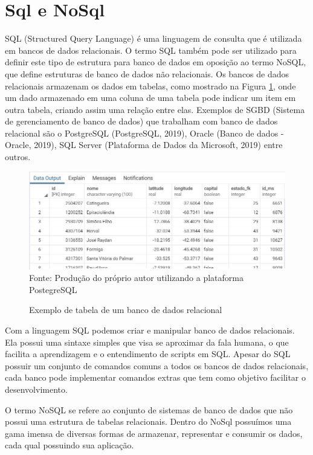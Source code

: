 \documentclass[
	12pt,				%
	openright,			%
	oneside,			%
	a4paper,			%
	chapter=TITLE,		%
	section=TITLE,		%
	subsection=TITLE,	%
	subsubsection=TITLE,%
	english,			%
	brazil				%
	]{abntex2}
\theoremstyle{definition}
\begin{document}
\section{Sql e NoSql}

    SQL (Structured Query Language) é uma linguagem de consulta que é utilizada em bancos de dados relacionais. O termo SQL também pode ser utilizado para definir este tipo de estrutura para banco de dados em oposição ao termo NoSQL, que define estruturas de banco de
    dados não relacionais. Os bancos de dados relacionais armazenam os dados em tabelas, como mostrado na Figura \ref{exemplo tabela}, onde um dado armazenado em uma coluna de uma tabela pode indicar um item em outra tabela, criando assim uma relação entre elas. Exemplos de SGBD (Sistema de gerenciamento de banco de dados) que trabalham com banco de dados relacional são o PostgreSQL (PostgreSQL, 2019), Oracle (Banco de dados - Oracle, 2019), SQL Server (Plataforma de Dados da Microsoft, 2019) entre outros. 
    
    \begin{figure}[!h]
         \centering
         \caption{Exemplo de tabela de um banco de dados relacional}
         \includegraphics[scale=0.8]{imagens/exemplo-tabela.jpg}
         \\{\footnotesize Fonte: Produção do próprio autor utilizando a plataforma PostegreSQL}
         \label{exemplo tabela}
    \end{figure}

    Com a linguagem SQL podemos criar e manipular banco de dados relacionais. Ela possui uma sintaxe simples que visa se aproximar da fala humana, o que facilita a aprendizagem e o entendimento de scripts em SQL. Apesar do SQL possuir um conjunto de comandos comuns a todos os bancos de dados relacionais, cada banco pode implementar comandos extras que tem como objetivo facilitar o desenvolvimento.

    O termo NoSQL se refere ao conjunto de sistemas de banco de dados que não possui uma estrutura de tabelas relacionais. Dentro do NoSql possuímos uma gama imensa de diversas formas de armazenar, representar e consumir os dados, cada qual possuindo sua aplicação.
    
\end{document}
